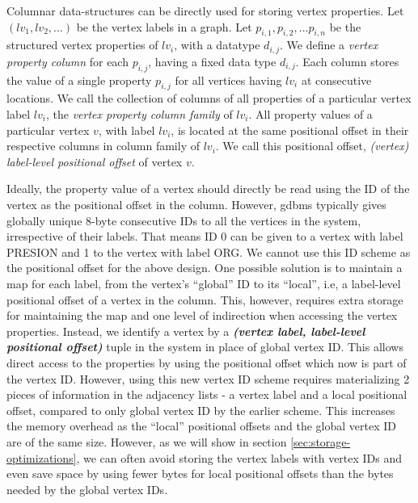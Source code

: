 Columnar data-structures can be directly used for storing vertex properties. Let $(lv_1, lv_2, ...)$ be the vertex labels in a graph. Let $p_{i,1},  p_{i,2}, ... p_{i, n}$ be the structured vertex properties of $lv_i$, with a datatype $d_{i,j}$. We define a \emph{vertex property column} for each $p_{i,j}$, having a fixed data type $d_{i,j}$. Each column stores the value of a single property $p_{i,j}$ for all vertices having $lv_i$ at consecutive locations. We call the collection of columns of all properties of a particular vertex label $lv_i$, the \emph{vertex property column family} of $lv_i$. All property values of a particular vertex $v$, with label $lv_i$, is located at the same positional offset in their respective columns in column family of  $lv_i$. We call this positional offset, \emph{(vertex) label-level positional offset} of vertex $v$.


Ideally, the property value of a vertex should directly be read using the ID of the vertex as the positional offset in the column. However, \gls{gdbms} typically gives globally unique 8-byte consecutive IDs to all the vertices in the system, irrespective of their labels. That means ID 0 can be given to a vertex with label PRESION and 1 to the vertex with label ORG. We cannot use this ID scheme as the positional offset for the above design. One possible solution is to maintain a map for each label, from the vertex's \enquote{global} ID to its \enquote{local}, i.e, a label-level positional offset of a vertex in the column. This, however, requires extra storage for maintaining the map and one level of indirection when accessing the vertex properties. Instead, we identify a vertex by a \emph{\textbf{(vertex label, label-level positional offset)}} tuple in the system in place of global vertex ID. This allows direct access to the properties by using the positional offset which now is part of the vertex ID. However, using this new vertex ID scheme requires materializing 2 pieces of information in the adjacency lists - a vertex label and a local positional offset, compared to only global vertex ID by the earlier scheme. This increases the memory overhead as the \enquote{local} positional offsets and the global vertex ID are of the same size. However, as we will show in section \ref{sec:storage-optimizations}, we can often avoid storing the vertex labels with vertex IDs and even save space by using fewer bytes for local positional offsets than the bytes needed by the global vertex IDs.

